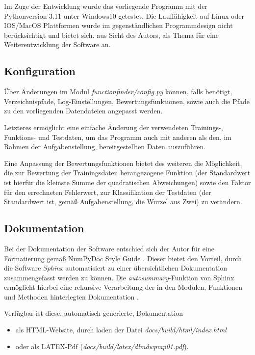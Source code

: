 Im Zuge der Entwicklung wurde das vorliegende Programm mit der Pythonversion 3.11 unter Windows10 getestet. Die Lauffähigkeit auf Linux oder IOS/MacOS Plattformen wurde im gegenständlichen Programmdesign nicht berücksichtigt und bietet sich, aus Sicht des Autors, als Thema für eine Weiterentwicklung der Software an.

\subsection{Konfiguration}

Über Änderungen im Modul \emph{functionfinder/config.py} können, falls benötigt, Verzeichnispfade, Log-Einstellungen, Bewertungsfunktionen, sowie auch die Pfade zu den vorliegenden Datendateien angepasst werden.

Letzteres ermöglicht eine einfache Änderung der verwendeten Trainings-, Funktions- und Testdaten, um das Programm auch mit anderen als den, im Rahmen der Aufgabenstellung, bereitgestellten Daten auszuführen.

Eine Anpassung der Bewertungsfunktionen bietet des weiteren die Möglichkeit, die zur Bewertung der Trainingsdaten herangezogene Funktion (der Standardwert ist hierfür die kleinste Summe der quadratischen Abweichungen) sowie den Faktor für den errechneten Fehlerwert, zur Klassifikation der Testdaten (der Standardwert ist, gemäß Aufgabenstellung, die Wurzel aus Zwei) zu verändern.

\subsection{Dokumentation}

Bei der Dokumentation der Software entschied sich der Autor für eine Formatierung gemäß NumPyDoc Style Guide \citep{numpydoc_v160_style_nodate}. Dieser bietet den Vorteil, durch die Software \emph{Sphinx} automatisiert zu einer übersichtlichen Dokumentation zusammengefasst werden zu können. Die \emph{autosummary}-Funktion von Sphinx ermöglicht hierbei eine rekursive Verarbeitung der in den Modulen, Funktionen und Methoden hinterlegten Dokumentation \citep{leedham_answer_2020}.

Verfügbar ist diese, automatisch generierte, Dokumentation
\begin{itemize}
 \itemsep0pt
 \item als HTML-Website, durch laden der Datei \emph{docs/build/html/index.html}
 \item oder als LATEX-Pdf (\emph{docs/build/latex/dlmdwpmp01.pdf}).
\end{itemize}


